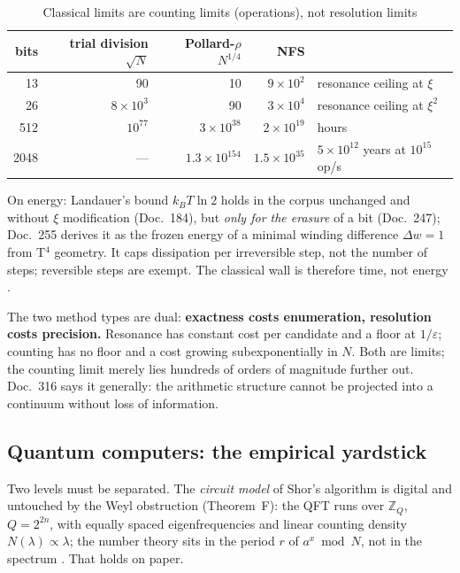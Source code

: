 \begin{table}[H]
\centering
\caption{Classical limits are counting limits (operations), not resolution limits}
\begin{tabular}{rrrrl}
\toprule
bits & trial division $\sqrt N$ & Pollard-$\rho$ $N^{1/4}$ & NFS & \\
\midrule
13 & 90 & 10 & $9\times10^{2}$ & resonance ceiling at $\xi$ \\
26 & $8\times10^3$ & 90 & $3\times10^{4}$ & resonance ceiling at $\xi^2$ \\
512 & $10^{77}$ & $3\times10^{38}$ & $2\times10^{19}$ & hours \\
2048 & --- & $1.3\times10^{154}$ & $1.5\times10^{35}$ & $5\times10^{12}$ years at $10^{15}$ op/s \\
\bottomrule
\end{tabular}
\end{table}

On energy: Landauer's bound $k_BT\ln2$ holds in the corpus unchanged and without
$\xi$ modification (Doc.~184), but \emph{only for the erasure} of a bit
(Doc.~247); Doc.~255 derives it as the frozen energy of a minimal winding
difference $\Delta w=1$ from T$^4$ geometry. It caps dissipation per
irreversible step, not the number of steps; reversible steps are exempt. The
classical wall is therefore time, not energy \BM.

The two method types are dual: \textbf{exactness costs enumeration,
resolution costs precision.} Resonance has constant cost per candidate and a
floor at $1/\varepsilon$; counting has no floor and a cost growing
subexponentially in $N$. Both are limits; the counting limit merely lies
hundreds of orders of magnitude further out. Doc.~316 says it generally: the
arithmetic structure cannot be projected into a continuum without loss of
information.


\subsection{Quantum computers: the empirical yardstick}

Two levels must be separated. The \emph{circuit model} of Shor's algorithm is
digital and untouched by the Weyl obstruction (Theorem~F): the QFT runs over
$\mathbb{Z}_Q$, $Q=2^{2n}$, with equally spaced eigenfrequencies and linear
counting density $N(\lambda)\propto\lambda$; the number theory sits in the period
$r$ of $a^x \bmod N$, not in the spectrum \BM. That holds on paper.

